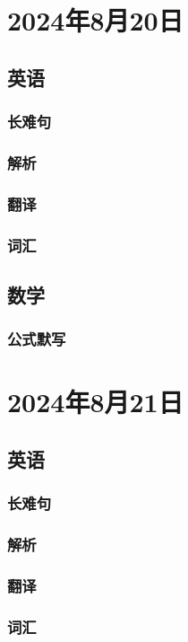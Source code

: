 \documentclass[UTF8]{ctexart}
\begin{document}
\section{2024年8月20日}
\subsection{英语}
\subsubsection{长难句}
\subsubsection{解析}
\subsubsection{翻译}
\subsubsection{词汇}
\subsection{数学}
\subsubsection{公式默写}
\begin{multicols}{2}
\end{multicols}
\section{2024年8月21日}
\subsection{英语}
\subsubsection{长难句}
\subsubsection{解析}
\subsubsection{翻译}
\subsubsection{词汇}
\end{document}
